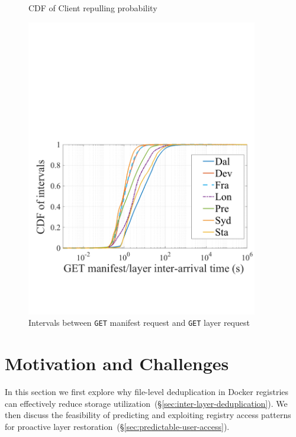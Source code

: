 \begin{figure}[t]
\begin{minipage}{0.3\textwidth}
                \caption{CDF of Client repulling probability}%
                \label{fig:client-repull-cdf}
        \end{minipage}%
	\hfill
        \begin{minipage}{0.3\textwidth}
        \centering
        \includegraphics[width=0.9\textwidth]{graphs/GML-intervals.pdf}
        \caption{Intervals between \texttt{GET} manifest request and \texttt{GET} layer request}
        \label{fig:intervals}
        \end{minipage}
\end{figure}



\section{Motivation and Challenges}
\label{sec:dataset-analysis}

In this section we first explore why file-level deduplication in Docker
registries can effectively reduce storage
utilization~(\S\ref{sec:inter-layer-deduplication}).
%
We then discuss the feasibility of predicting and exploiting registry access
patterns for proactive layer restoration~(\S\ref{sec:predictable-user-access}).

